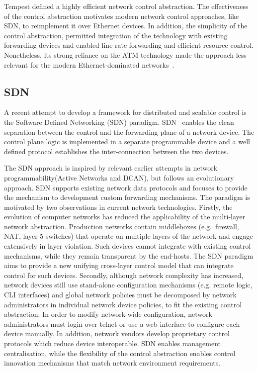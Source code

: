 Tempest defined a highly efficient network control abstraction. The
effectiveness of the control abstraction motivates modern network control
approaches, like SDN, to reimplement it over Ethernet devices.  In addition, the
simplicity of the control abstraction, permitted integration of the technology
with existing forwarding devices  and enabled line rate forwarding and efficient
resource control.  Nonetheless, its strong reliance on the ATM technology made
the approach less relevant for the modern Ethernet-dominated networks~\cite{Crosby2002}. 

\subsection{SDN}\label{sec:background:sdn} 

A recent attempt to develop a framework for distributed and scalable control is
the Software Defined Networking (SDN) paradigm. SDN~\cite{sdn} enables the clean
separation between the control and the forwarding plane of a network device. The
control plane logic is implemented in a separate programmable device and a well
defined protocol establishes the inter-connection between the two devices. 

The SDN approach is inspired by relevant earlier attempts in network
programmability(Active Networks and DCAN), but follows an evolutionary approach.
SDN supports existing network data protocols and focuses to provide the
mechanism to development custom forwarding mechanisms.  The paradigm is
motivated by two observations in current network technologies.  Firstly, the
evolution of computer networks has reduced the applicability of the multi-layer
network abstraction. Production networks contain middleboxes (e.g.~firewall,
NAT, layer-5 switches) that operate on multiple layers of the network and engage
extensively in layer violation.  Such devices cannot integrate with existing
control mechanisms, while they remain transparent by the end-hosts. The SDN
paradigm aims to provide a new unifying cross-layer control model that can
integrate control for such devices.  Secondly, although network complexity has
increased, network devices still use stand-alone configuration mechanisms (e.g.
remote logic, CLI interfaces) and global network policies must be decomposed by
network administrators in individual network device policies, to fit the
existing control abstraction. In order to modify network-wide configuration,
network administrators must login over telnet or use a web interface to
configure each device manually.  In addition, network vendors develop
proprietary control protocols which reduce device interoperable.  SDN enables
management centralisation, while the flexibility of the control abstraction
enables control innovation mechanisms that match network environment
requirements.

